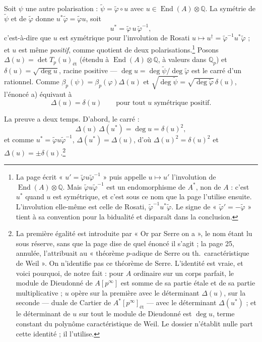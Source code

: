\documentclass[11pt,a4paper]{article}
\begin{document}
Soit $\psi$ une autre polarisation : $\tilde\psi = \tilde\varphi \circ u$ avec
$u \in \operatorname{End}(A) \otimes \mathbb{Q}$. La symétrie de $\tilde\psi$
et de $\tilde\varphi$ donne $u^* \tilde\varphi = \tilde\varphi u$, soit
\[
u^* = \tilde\varphi\, u\, \tilde\varphi^{-1} ,
\]
c'est-à-dire que $u$ est symétrique pour l'involution de Rosati $u \mapsto
u^\dagger = \tilde\varphi^{-1} u^* \tilde\varphi$ ; et $u$ est même
\emph{positif}, comme quotient de deux polarisations.\footnote{La page écrit
« $u' = \tilde\varphi u \tilde\varphi^{-1}$ » puis appelle $u \mapsto u'$
l'involution de $\operatorname{End}(A) \otimes \mathbb{Q}$. Mais
$\tilde\varphi u \tilde\varphi^{-1}$ est un endomorphisme de $A^*$, non de
$A$ : c'est $u^*$ quand $u$ est symétrique, et c'est sous ce nom que la
page l'utilise ensuite. L'involution elle-même est celle de Rosati,
$\tilde\varphi^{-1} u^* \tilde\varphi$. Le signe de « $\tilde\varphi' =
-\tilde\varphi$ » tient à sa convention pour la bidualité et disparaît dans
la conclusion.} Posons $\Delta(u) = \det T_p(u)_{\text{ét}}$ (étendu à
$\operatorname{End}(A) \otimes \mathbb{Q}$, à valeurs dans $\mathbb{Q}_p$) et
$\delta(u) = \sqrt{\deg u}$, racine positive --- $\deg u = \deg\tilde\psi /
\deg\tilde\varphi$ est le carré d'un rationnel. Comme $\beta_p(\psi) =
\beta_p(\varphi)\Delta(u)$ et $\sqrt{\deg\tilde\psi} =
\sqrt{\deg\tilde\varphi}\,\delta(u)$, l'énoncé a) équivaut à
\[
\Delta(u) = \delta(u) \qquad \text{pour tout } u \text{ symétrique positif.}
\]

La preuve a deux temps. D'abord, le carré :
\[
\Delta(u)\,\Delta(u^*) = \deg u = \delta(u)^2 ,
\]
et comme $u^* = \tilde\varphi u \tilde\varphi^{-1}$, $\Delta(u^*) = \Delta(u)$,
d'où $\Delta(u)^2 = \delta(u)^2$ et $\Delta(u) = \pm\delta(u)$.\footnote{La
première égalité est introduite par « Or par Serre on a », le nom étant lu
sous réserve, sans que la page dise de quel énoncé il s'agit ; la page 25,
annulée, l'attribuait au « théorème $p$-adique de Serre ou th.\
caractéristique de Weil ». On n'identifie pas ce théorème de Serre. L'identité
est vraie, et voici pourquoi, de notre fait : pour $A$ ordinaire sur un corps parfait, le
module de Dieudonné de $A[p^\infty]$ est somme de sa partie étale et de sa
partie multiplicative ; $u$ opère sur la première avec le déterminant
$\Delta(u)$, sur la seconde --- duale de Cartier de $A^*[p^\infty]_{\text{ét}}$
--- avec le déterminant $\Delta(u^*)$ ; et le déterminant de $u$ sur tout le
module de Dieudonné est $\deg u$, terme constant du polynôme caractéristique
de Weil. Le dossier n'établit nulle part cette identité ; il l'utilise.}
\end{document}
